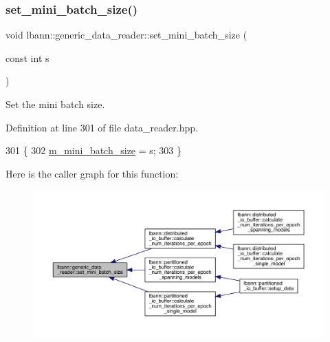 \subsubsection{\texorpdfstring{set\+\_\+mini\+\_\+batch\+\_\+size()}{set\_mini\_batch\_size()}}
{\footnotesize\ttfamily void lbann\+::generic\+\_\+data\+\_\+reader\+::set\+\_\+mini\+\_\+batch\+\_\+size (\begin{DoxyParamCaption}\item[{const int}]{s }\end{DoxyParamCaption})\hspace{0.3cm}{\ttfamily [inline]}}



Set the mini batch size. 



Definition at line 301 of file data\+\_\+reader.\+hpp.


\begin{DoxyCode}
301                                         \{
302     \hyperlink{classlbann_1_1generic__data__reader_a96f87a7d09711ab3eee3940ff2aa36ec}{m\_mini\_batch\_size} = s;
303   \}
\end{DoxyCode}
Here is the caller graph for this function\+:\nopagebreak
\begin{figure}[H]
\begin{center}
\leavevmode
\includegraphics[width=350pt]{classlbann_1_1generic__data__reader_adf161cca4b80eb95f9748050e7fe1809_icgraph}
\end{center}
\end{figure}
\mbox{\label{classlbann_1_1generic__data__reader_ab20e835e0e0565717e0fd74da09d4890}} 
